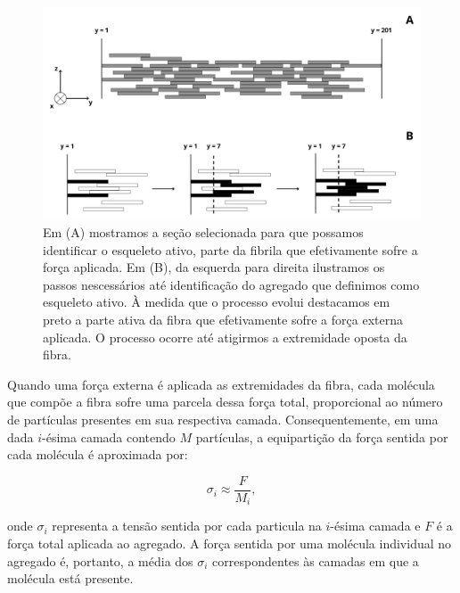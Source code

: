 \documentclass{article}
\begin{document}
        \begin{figure}[H]
            \centering
            \includegraphics[width=\textwidth]{figures/esqueleto.png}
    
            \caption{Em (A) mostramos a seção selecionada para que possamos identificar o esqueleto ativo, parte da fibrila
            que efetivamente sofre a força aplicada. Em (B), da esquerda para direita ilustramos os passos nescessários 
            até identificação do agregado que definimos como esqueleto ativo. À medida que o processo evolui destacamos 
            em preto a parte ativa da fibra que efetivamente sofre a força externa aplicada. O processo ocorre até 
            atigirmos a extremidade oposta da fibra.}  
    
            \label{M3}
        \end{figure}

        Quando uma força externa é aplicada as extremidades da fibra, cada molécula que compõe a fibra sofre uma parcela 
        dessa força total, proporcional ao número de partículas presentes em sua respectiva camada. Consequentemente, em 
        uma dada \(i\)-ésima camada contendo \(M\) partículas, a equipartição da força sentida por cada molécula é aproximada
         por:  

        \begin{equation}
            \sigma_{i} \approx \frac{F}{M_{i}},
        \end{equation}
            

        \noindent onde \(\sigma_{i}\) representa a tensão sentida por cada particula na \(i\)-ésima camada e \(F\) é a força 
        total aplicada ao agregado. A força sentida por uma molécula individual no agregado é, portanto, a média dos \(\sigma_{i}\) 
        correspondentes às camadas em que a molécula está presente. 
        
\end{document}
